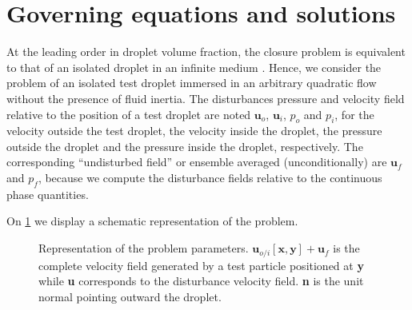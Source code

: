 



\section{Governing equations and solutions}


At the leading order in droplet volume fraction, the closure problem is equivalent to that of an isolated droplet in an infinite medium \citet{hinch1977averaged}. 
Hence, we consider the problem of an isolated test droplet immersed in an arbitrary quadratic flow without the presence of fluid inertia. 
The disturbances pressure and velocity field relative to the position of a test droplet are noted $\textbf{u}_{o}$, $\textbf{u}_{i}$, $p_{o}$ and $p_{i}$, for the velocity outside the test droplet, the velocity inside the droplet, the pressure outside the droplet and the pressure inside the droplet, respectively. 
The corresponding ``undisturbed field'' or ensemble averaged (unconditionally) are $\textbf{u}_f$ and $p_f$, because we compute the disturbance fields relative to the continuous phase quantities. 

On \ref{fig:disturbance} we display a schematic representation of the problem. 
\begin{figure}[h!]
    \centering
    \caption{Representation of the problem parameters. $\textbf{u}_{o/i}[\textbf{x},\textbf{y}]+\textbf{u}_f$ is the complete velocity field generated by a test particle positioned at \textbf{y} while \textbf{u} corresponds to the disturbance velocity field.
    \textbf{n} is the unit normal  pointing outward the droplet. }
    \label{fig:disturbance}
\end{figure}

